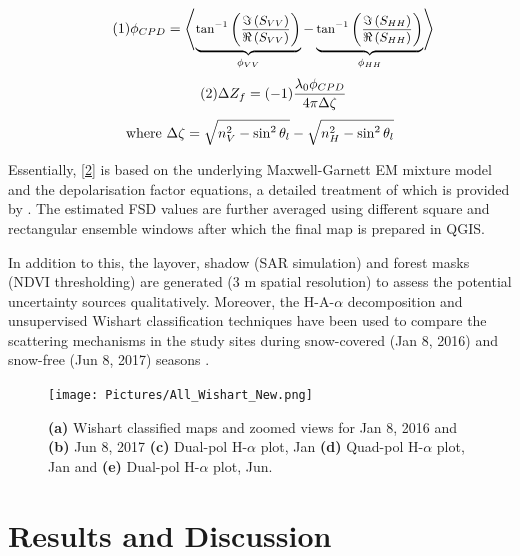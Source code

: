 \documentclass{article}
\begin{document}
\begin{equation}\tag{1}
    \centering
    \small{\phi_{CPD} =\left\langle\underbrace{\tan^{-1}\left(\frac{\Im\left(S_{VV}\right)}{\Re\left(S_{VV}\right)}\right)}_{\phi_{VV}} - \underbrace{\tan^{-1}\left(\frac{\Im\left(S_{HH}\right)}{\Re\left(S_{HH}\right)}\right)}_{\phi_{HH}}\right\rangle}
    \label{1}
\end{equation}
\begin{equation}\tag{2}
    \centering
    \small{\Delta{Z_f} = (-1)\frac{\lambda_0\phi_{CPD}}{4\pi\Delta{\zeta}}}
    \label{2}
\end{equation}
\begin{equation*}
    \centering
    \text{where } \small{\Delta{\zeta} = \sqrt{n^2_V - \sin^{2}\theta_l} - \sqrt{n^2_H - \sin^{2}\theta_l}}
\end{equation*}

Essentially, \eqref{2} is based on the underlying Maxwell-Garnett EM mixture model and the depolarisation factor equations, a detailed treatment of which is provided by \cite{Sihvola1999}. The estimated FSD values are further averaged using different square and rectangular ensemble windows after which the final map is prepared in QGIS.

In addition to this, the layover, shadow (SAR simulation) and forest masks (NDVI thresholding) are generated (3 m spatial resolution) to assess the potential uncertainty sources qualitatively. Moreover, the H-A-$\alpha$ decomposition and unsupervised Wishart classification techniques have been used to compare the scattering mechanisms in the study sites during snow-covered (Jan 8, 2016) and snow-free (Jun 8, 2017) seasons \cite{Singh2014}.

\begin{figure}[htb]
    \centering
    \texttt{[image: Pictures/All\_Wishart\_New.png]}
    \vspace{-4ex}
    \caption{\textbf{(a)} Wishart classified maps and zoomed views for Jan 8, 2016 and \textbf{(b)} Jun 8, 2017 \textbf{(c)} Dual-pol H-$\alpha$ plot, Jan \textbf{(d)} Quad-pol H-$\alpha$ plot, Jan and \textbf{(e)} Dual-pol H-$\alpha$ plot, Jun.}
    \label{fig:wishart}
\end{figure}

\section{Results and Discussion}
\label{sec:results}
\end{document}
